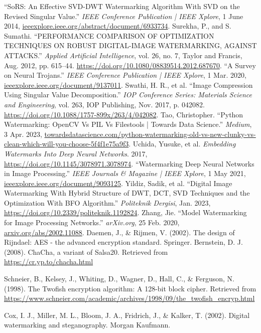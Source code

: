 \documentclass[conference]{IEEEtran}
\begin{document}
\begin{thebibliography}{00}
 “SoRS: An Effective SVD-DWT Watermarking Algorithm With SVD on the Revised Singular Value.” \textit{IEEE Conference Publication | IEEE Xplore}, 1 June 2014, \url{ieeexplore.ieee.org/abstract/document/6933734}.
 Surekha, P., and S. Sumathi. “PERFORMANCE COMPARISON OF OPTIMIZATION TECHNIQUES ON ROBUST DIGITAL-IMAGE WATERMARKING, AGAINST ATTACKS.” \textit{Applied Artificial Intelligence}, vol. 26, no. 7, Taylor and Francis, Aug. 2012, pp. 615–44. \url{https://doi.org/10.1080/08839514.2012.687670}.
 “A Survey on Neural Trojans.” \textit{IEEE Conference Publication | IEEE Xplore}, 1 Mar. 2020, \url{ieeexplore.ieee.org/document/9137011}.
 Swathi, H. R., et al. “Image Compression Using Singular Value Decomposition.” \textit{IOP Conference Series: Materials Science and Engineering}, vol. 263, IOP Publishing, Nov. 2017, p. 042082. \url{https://doi.org/10.1088/1757-899x/263/4/042082}.
 Tao, Christopher. “Python Watermarking: OpenCV Vs PIL Vs Filestools | Towards Data Science.” \textit{Medium}, 3 Apr. 2023, \url{towardsdatascience.com/python-watermarking-old-vs-new-clunky-vs-clean-which-will-you-choose-5f4f1e75a9f3}.
 Uchida, Yusuke, et al. \textit{Embedding Watermarks Into Deep Neural Networks}. 2017, \url{https://doi.org/10.1145/3078971.3078974}.
 “Watermarking Deep Neural Networks in Image Processing.” \textit{IEEE Journals & Magazine | IEEE Xplore}, 1 May 2021, \url{ieeexplore.ieee.org/document/9093125}.
 Yildiz, Sadik, et al. “Digital Image Watermarking With Hybrid Structure of DWT, DCT, SVD Techniques and the Optimization With BFO Algorithm.” \textit{Politeknik Dergisi}, Jan. 2023, \url{https://doi.org/10.2339/politeknik.1192824}.
 Zhang, Jie. “Model Watermarking for Image Processing Networks.” \textit{arXiv.org}, 25 Feb. 2020, \url{arxiv.org/abs/2002.11088}.
 Daemen, J., \& Rijmen, V. (2002). The design of Rijndael: AES - the advanced encryption standard. Springer.
 Bernstein, D. J. (2008). ChaCha, a variant of Salsa20. Retrieved from \url{https://cr.yp.to/chacha.html}

 Schneier, B., Kelsey, J., Whiting, D., Wagner, D., Hall, C., \& Ferguson, N. (1998). The Twofish encryption algorithm: A 128-bit block cipher. Retrieved from \url{https://www.schneier.com/academic/archives/1998/09/the_twofish_encryp.html}

 Cox, I. J., Miller, M. L., Bloom, J. A., Fridrich, J., \& Kalker, T. (2002). Digital watermarking and steganography. Morgan Kaufmann.


\end{thebibliography}
\end{document}
